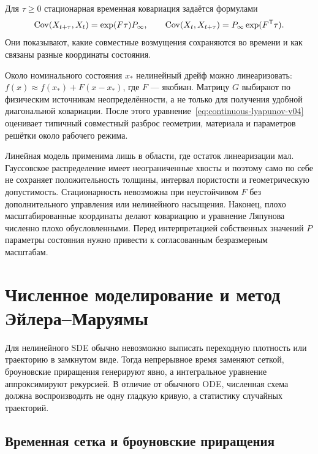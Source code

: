 Для $\tau\geq0$ стационарная временная ковариация задаётся формулами
\begin{equation}
\label{eq:lti-stationary-cross-covariance-v04}
\operatorname{Cov}(X_{t+\tau},X_t)
=
\exp(F\tau)P_{\infty},
\qquad
\operatorname{Cov}(X_t,X_{t+\tau})
=
P_{\infty}\exp(F^{\mathsf{T}}\tau).
\end{equation}
Они показывают, какие совместные возмущения сохраняются во времени и как связаны разные координаты состояния.

\begin{application}
Около номинального состояния $x_{\ast}$ нелинейный дрейф можно линеаризовать: $f(x)\approx f(x_{\ast})+F(x-x_{\ast})$, где $F$ --- якобиан. Матрицу $G$ выбирают по физическим источникам неопределённости, а не только для получения удобной диагональной ковариации. После этого уравнение~\eqref{eq:continuous-lyapunov-v04} оценивает типичный совместный разброс геометрии, материала и параметров решётки около рабочего режима.
\end{application}

Линейная модель применима лишь в области, где остаток линеаризации мал. Гауссовское распределение имеет неограниченные хвосты и поэтому само по себе не сохраняет положительность толщины, интервал пористости и геометрическую допустимость. Стационарность невозможна при неустойчивом $F$ без дополнительного управления или нелинейного насыщения. Наконец, плохо масштабированные координаты делают ковариацию и уравнение Ляпунова численно плохо обусловленными. Перед интерпретацией собственных значений $P$ параметры состояния нужно привести к согласованным безразмерным масштабам.

\section{Численное моделирование и метод Эйлера--Маруямы}
\label{sec:numerical-simulation-euler-maruyama}

Для нелинейного SDE обычно невозможно выписать переходную плотность или траекторию в замкнутом виде. Тогда непрерывное время заменяют сеткой, броуновские приращения генерируют явно, а интегральное уравнение аппроксимируют рекурсией. В отличие от обычного ODE, численная схема должна воспроизводить не одну гладкую кривую, а статистику случайных траекторий.

\subsection{Временная сетка и броуновские приращения}

